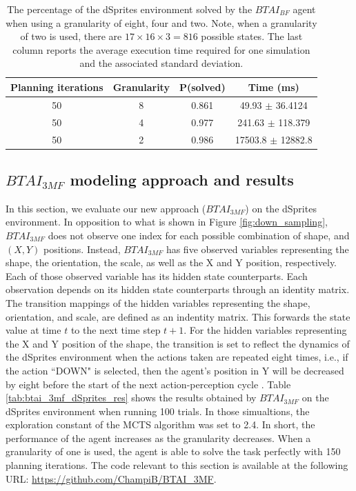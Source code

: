 \documentclass[twoside,11pt]{article}
\begin{document}
\begin{table}[H]
\centering
\begin{tabular}{ |c|c|c|c| }
 \hline
 Planning iterations & Granularity & P(solved) & Time (ms) \\
 \hline
 50 & 8 & 0.861 & 49.93 $\pm$ 36.4124 \\
 \hline
 50 & 4 & 0.977 & 241.63 $\pm$ 118.379 \\
 \hline
 50 & 2 & 0.986 & 17503.8 $\pm$ 12882.8 \\
 \hline
\end{tabular}
\caption{The percentage of the dSprites environment solved by the $BTAI_{BF}$ agent when using a granularity of eight, four and two. Note, when a granularity of two is used, there are $17 \times 16 \times 3 = 816$ possible states. The last column reports the average execution time required for one simulation and the associated standard deviation.}
\label{tab:btai_bf_dSprites_res}
\end{table}

\subsection{$BTAI_{3MF}$ modeling approach and results} \label{ssec:btai_3mf}

In this section, we evaluate our new approach ($BTAI_{3MF}$) on the dSprites environment. In opposition to what is shown in Figure \ref{fig:down_sampling}, $BTAI_{3MF}$ does not observe one index for each possible combination of shape, and $(X, Y)$ positions. Instead, $BTAI_{3MF}$ has five observed variables representing the shape, the orientation, the scale, as well as the X and Y position, respectively. Each of those observed variable has its hidden state counterparts. Each observation depends on its hidden state counterparts through an identity matrix. The transition mappings of the hidden variables representing the shape, orientation, and scale, are defined as an indentity matrix. This forwards the state value at time $t$ to the next time step $t + 1$. For the hidden variables representing the X and Y position of the shape, the transition is set to reflect the dynamics of the dSprites environment when the actions taken are repeated eight times, i.e., if the action ``DOWN" is selected, then the agent's position in Y will be decreased by eight before the start of the next action-perception cycle \citep{DeepAIwithMCMC}. Table \ref{tab:btai_3mf_dSprites_res} shows the results obtained by $BTAI_{3MF}$ on the dSprites environment when running 100 trials. In those simualtions, the exploration constant of the MCTS algorithm was set to 2.4. In short, the performance of the agent increases as the granularity decreases. When a granularity of one is used, the agent is able to solve the task perfectly with 150 planning iterations. The code relevant to this section is available at the following URL: \url{https://github.com/ChampiB/BTAI_3MF}.
\end{document}

